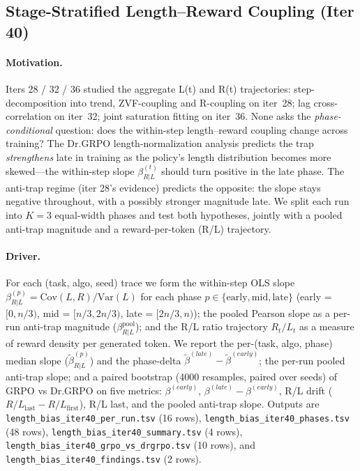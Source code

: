 \subsection{Stage-Stratified Length--Reward Coupling (Iter 40)}
\label{sec:length-bias-iter40}

\paragraph{Motivation.}
Iters 28 / 32 / 36 studied the aggregate L(t) and R(t) trajectories:
step-decomposition into trend, ZVF-coupling and R-coupling on
iter~28; lag cross-correlation on iter~32; joint saturation fitting
on iter~36.  None asks the \emph{phase-conditional} question: does
the within-step length--reward coupling change across training?  The
Dr.GRPO length-normalization analysis predicts the trap
\emph{strengthens} late in training as the policy's length
distribution becomes more skewed---the within-step slope
$\beta_{R|L}^{(t)}$ should turn positive in the late phase.  The
anti-trap regime (iter 28's evidence) predicts the opposite: the
slope stays negative throughout, with a possibly stronger magnitude
late.  We split each run into $K=3$ equal-width phases and test both
hypotheses, jointly with a pooled anti-trap magnitude and a
reward-per-token (R/L) trajectory.

\paragraph{Driver.}
For each (task, algo, seed) trace we form the within-step OLS slope
$\beta_{R|L}^{(p)} = \mathrm{Cov}(L,R)/\mathrm{Var}(L)$ for each phase
$p \in \{\mathrm{early},\mathrm{mid},\mathrm{late}\}$ (early =
$[0, n/3)$, mid = $[n/3, 2n/3)$, late = $[2n/3, n)$); the pooled
Pearson slope as a per-run anti-trap magnitude
($\beta_{R|L}^{\mathrm{pool}}$); and the R/L ratio trajectory
$R_t / L_t$ as a measure of reward density per generated token.  We
report the per-(task, algo, phase) median slope
($\tilde\beta_{R|L}^{(p)}$) and the phase-delta
$\tilde\beta^{(late)} - \tilde\beta^{(early)}$; the per-run pooled
anti-trap slope; and a paired bootstrap (4000 resamples, paired over
seeds) of GRPO vs Dr.GRPO on five metrics:
$\beta^{(early)}$, $\beta^{(late)}-\beta^{(early)}$, R/L drift
($R/L_{\mathrm{last}} - R/L_{\mathrm{first}}$), R/L last, and the
pooled anti-trap slope.  Outputs are
\texttt{length\_bias\_iter40\_per\_run.tsv} (16 rows),
\texttt{length\_bias\_iter40\_phases.tsv} (48 rows),
\texttt{length\_bias\_iter40\_summary.tsv} (4 rows),
\texttt{length\_bias\_iter40\_grpo\_vs\_drgrpo.tsv} (10 rows), and
\texttt{length\_bias\_iter40\_findings.tsv} (2 rows).

